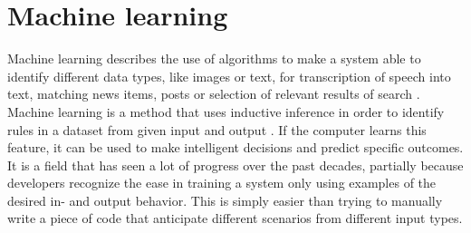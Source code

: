 \section{Machine learning}
Machine learning describes the use of algorithms to make a system able to identify different data types, like images or text, for transcription of speech into text, matching news items, posts or selection of relevant results of search \citep{LeCun2015}.
Machine learning is a method that uses inductive inference in order to identify rules in a dataset from given input and output \citep{Nielsen2010}. If the computer learns this feature, it can be used to make intelligent decisions and predict specific outcomes.\citep{Nielsen2010}
It is a field that has seen a lot of progress over the past decades, partially because developers recognize the ease in training a system only using examples of the desired in- and output behavior. This is simply easier than trying to manually write a piece of code that anticipate different scenarios from different input types.\citep{Jordan2015}


